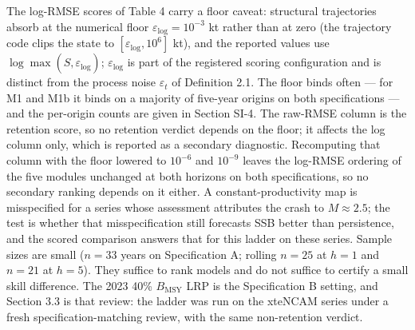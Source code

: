 \documentclass[11pt]{article}
\begin{document}
The log-RMSE scores of Table 4 carry a floor caveat: structural
trajectories absorb at the numerical floor
\(\varepsilon_{\mathrm{log}} = 10^{-3}\) kt rather than at zero (the
trajectory code clips the state to
\([\varepsilon_{\mathrm{log}}, 10^{6}]\) kt), and the reported values
use \(\log\max(\hat S, \varepsilon_{\mathrm{log}})\);
\(\varepsilon_{\mathrm{log}}\) is part of the registered scoring
configuration and is distinct from the process noise \(\varepsilon_t\)
of Definition 2.1. The floor binds often --- for M1 and M1b it binds on a majority of
five-year origins on both specifications --- and the per-origin counts
are given in Section SI-4. The raw-RMSE column is the retention score, so no retention verdict
depends on the floor; it affects the log column only, which is reported
as a secondary diagnostic. Recomputing that column with the floor
lowered to \(10^{-6}\) and \(10^{-9}\) leaves the log-RMSE ordering of
the five modules unchanged at both horizons on both specifications, so
no secondary ranking depends on it either. A constant-productivity map is
misspecified for a series whose assessment attributes the crash to
\(M \approx 2.5\); the test is whether that misspecification still
forecasts SSB better than persistence, and the scored comparison answers
that for this ladder on these series. Sample sizes are small
(\(n=33\) years on Specification A; rolling \(n=25\) at \(h=1\) and
\(n=21\) at \(h=5\)). They suffice to rank models and do not suffice to
certify a small skill difference. The 2023 40\% \(B_{\mathrm{MSY}}\) LRP
is the Specification B setting, and Section 3.3 is that review: the
ladder was run on the xteNCAM series under a fresh
specification-matching review, with the same non-retention verdict.
\end{document}
